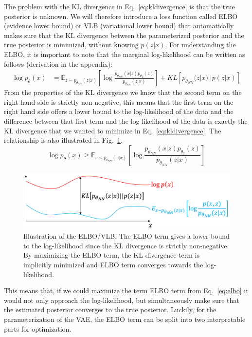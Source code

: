 The problem with the KL divergence in Eq.~\ref{eq:kldivergence} is that the true posterior is unknown. We will therefore introduce a loss function called ELBO (evidence lower bound) or VLB (variational lower bound) that automatically makes sure that the KL divergence between the parameterized posterior and the true posterior is minimized, without knowing $p(z|x)$. For understanding the ELBO, it is important to note that the marginal log-likelihood can be written as follows (derivation in the appendix):
\begin{align}
    \log p_{\theta}(x) & = \mathbb{E}_{z\sim p_{\theta_{NN}}(z|x)}\left[\log \frac{p_{\theta_{NN}}(x|z) p_{\theta_z}(z)}{p_{\theta_{NN}}(z|x)}\right] + KL\left[p_{\theta_{NN}}(z|x)||p(z|x)\right]
\end{align}
From the properties of the KL divergence we know that the second term on the right hand side is strictly non-negative, this means that the first term on the right hand side offers a lower bound to the log-likelihood of the data and the difference between that first term and the log-likelihood of the data is exactly the KL divergence that we wanted to minimize in Eq.~\ref{eq:kldivergence}. The relationship is also illustrated in Fig.~\ref{fig:elbo}.
\begin{equation}
    \label{eq:elbo}
    \log p_{\theta}(x) \geq \mathbb{E}_{z\sim p_{\theta_{NN}}(z|x)}\left[\log\frac{p_{\theta_{NN}}(x|z) p_{\theta_z}(z)}{p_{\theta_{NN}}(z|x)}\right]
\end{equation}
\begin{figure}[h]
    \centering
    \includegraphics[width=.5\textwidth]{images/elbo.png}
    \caption[Illustration of the ELBO/VLB]{Illustration of the ELBO/VLB: The ELBO term gives a lower bound to the log-likelihood since the KL divergence is strictly non-negative. By maximizing the ELBO term, the KL divergence term is implicitly minimized and ELBO term converges towards the log-likelihood.}
    \label{fig:elbo}
\end{figure}
This means that, if we could maximize the term ELBO term from Eq.~\ref{eq:elbo} it would not only approach the log-likelihood, but simultaneously make sure that the estimated posterior converges to the true posterior. Luckily, for the parameterization of the VAE, the ELBO term can be split into two interpretable parts for optimization.
